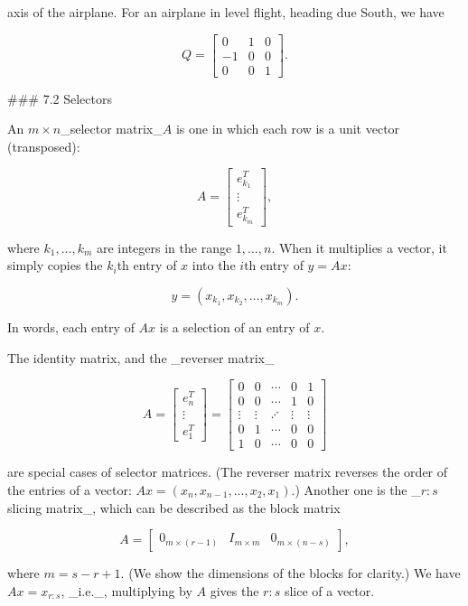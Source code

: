 axis of the airplane. For an airplane in level flight, heading due South, we have

\[Q=\left[\begin{array}{rrr}0&1&0\\ -1&0&0\\ 0&0&1\end{array}\right].\]

### 7.2 Selectors

An \(m\times n\)_selector matrix_\(A\) is one in which each row is a unit vector (transposed):

\[A=\left[\begin{array}{c}e_{k_{1}}^{T}\\ \vdots\\ e_{k_{m}}^{T}\end{array}\right],\]

where \(k_{1},\ldots,k_{m}\) are integers in the range \(1,\ldots,n\). When it multiplies a vector, it simply copies the \(k_{i}\)th entry of \(x\) into the \(i\)th entry of \(y=Ax\):

\[y=(x_{k_{1}},x_{k_{2}},\ldots,x_{k_{m}}).\]

In words, each entry of \(Ax\) is a selection of an entry of \(x\).

The identity matrix, and the _reverser matrix_

\[A=\left[\begin{array}{c}e_{n}^{T}\\ \vdots\\ e_{1}^{T}\end{array}\right]=\left[\begin{array}{ccccc}0&0&\cdots&0&1\\ 0&0&\cdots&1&0\\ \vdots&\vdots&\iddots&\vdots&\vdots\\ 0&1&\cdots&0&0\\ 1&0&\cdots&0&0\end{array}\right]\]

are special cases of selector matrices. (The reverser matrix reverses the order of the entries of a vector: \(Ax=(x_{n},x_{n-1},\ldots,x_{2},x_{1})\).) Another one is the _\(r\!:\!s\) slicing matrix_, which can be described as the block matrix

\[A=\left[\begin{array}{cc}0_{m\times(r-1)}&I_{m\times m}&0_{m\times(n-s)}\end{array} \right],\]

where \(m=s-r+1\). (We show the dimensions of the blocks for clarity.) We have \(Ax=x_{r\!:\!s}\), _i.e._, multiplying by \(A\) gives the \(r\!:\!s\) slice of a vector.

